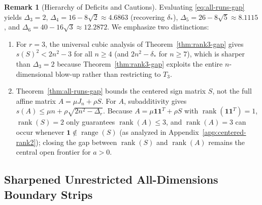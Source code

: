 \documentclass[11pt,reqno]{article}
\theoremstyle{definition}
\newtheorem{remark}[theorem]{Remark}
\newcommand{\one}{\mathbf{1}}
\newcommand{\rank}{\operatorname{rank}}
\begin{document}
\begin{remark}[Hierarchy of Deficits and Cautions]\label{rem:all-runs-hierarchy}
Evaluating \eqref{eq:all-runs-gap} yields $\Delta_3 = 2$, $\Delta_4 = 16 - 8\sqrt{2} \approx 4.6863$ (recovering $\delta_*$), $\Delta_5 = 26 - 8\sqrt{5} \approx 8.1115$, and $\Delta_6 = 40 - 16\sqrt{3} \approx 12.2872$. We emphasize two distinctions:
\begin{enumerate}
    \item For $r=3$, the universal cubic analysis of Theorem~\ref{thm:rank3-gap} gives $s(S)^2 < 2n^2 - 3$ for all $n \ge 4$ (and $2n^2 - \delta_*$ for $n \ge 7$), which is sharper than $\Delta_3 = 2$ because Theorem~\ref{thm:rank3-gap} exploits the entire $n$-dimensional blow-up rather than restricting to $T_3$.
    \item Theorem~\ref{thm:all-runs-gap} bounds the centered sign matrix $S$, not the full affine matrix $A = \mu J_n + \rho S$. For $A$, subadditivity gives $s(A) \le \mu n + \rho \sqrt{2n^2 - \Delta_r}$. Because $A = \mu \one \one^T + \rho S$ with $\rank(\one \one^T) = 1$, $\rank(S) = 2$ only guarantees $\rank(A) \le 3$, and $\rank(A) = 3$ can occur whenever $\one \notin \operatorname{range}(S)$ (as analyzed in Appendix~\ref{app:centered-rank2}); closing the gap between $\rank(S)$ and $\rank(A)$ remains the central open frontier for $a > 0$.
\end{enumerate}
\end{remark}

\subsection{Sharpened Unrestricted All-Dimensions Boundary Strips}
\end{document}
